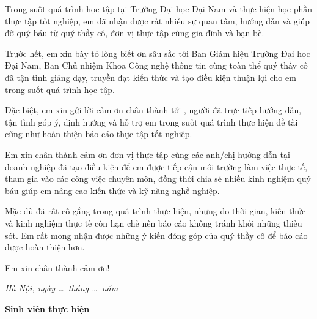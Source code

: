 
Trong suốt quá trình học tập tại Trường Đại học Đại Nam và thực hiện học phần thực tập tốt nghiệp, em đã nhận được rất nhiều sự quan tâm, hướng dẫn và giúp đỡ quý báu từ quý thầy cô, đơn vị thực tập cùng gia đình và bạn bè.

Trước hết, em xin bày tỏ lòng biết ơn sâu sắc tới Ban Giám hiệu Trường Đại học Đại Nam, Ban Chủ nhiệm Khoa Công nghệ thông tin cùng toàn thể quý thầy cô đã tận tình giảng dạy, truyền đạt kiến thức và tạo điều kiện thuận lợi cho em trong suốt quá trình học tập.

Đặc biệt, em xin gửi lời cảm ơn chân thành tới \textbf{\GiangVienHD}, người đã trực tiếp hướng dẫn, tận tình góp ý, định hướng và hỗ trợ em trong suốt quá trình thực hiện đề tài cũng như hoàn thiện báo cáo thực tập tốt nghiệp.

Em xin chân thành cảm ơn đơn vị thực tập cùng các anh/chị hướng dẫn tại doanh nghiệp đã tạo điều kiện để em được tiếp cận môi trường làm việc thực tế, tham gia vào các công việc chuyên môn, đồng thời chia sẻ nhiều kinh nghiệm quý báu giúp em nâng cao kiến thức và kỹ năng nghề nghiệp.

Mặc dù đã rất cố gắng trong quá trình thực hiện, nhưng do thời gian, kiến thức và kinh nghiệm thực tế còn hạn chế nên báo cáo không tránh khỏi những thiếu sót. Em rất mong nhận được những ý kiến đóng góp của quý thầy cô để báo cáo được hoàn thiện hơn.

Em xin chân thành cảm ơn!

\vspace{1cm}

\begin{flushright}
\begin{minipage}{8cm}
\centering

\textit{Hà Nội, ngày \ldots\ tháng \ldots\ năm \Nam}

\vspace{0.7cm}

\textbf{Sinh viên thực hiện}

\vspace{2.5cm}

\textbf{\TenSinhVien}

\end{minipage}
\end{flushright}